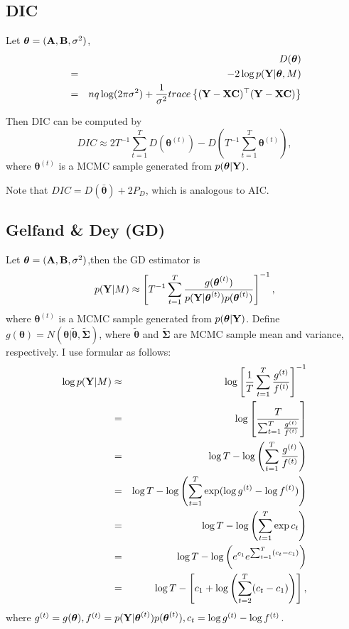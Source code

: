 \documentclass[]{book}
\begin{document}
\hypertarget{dic}{%
\subsection{DIC}\label{dic}}

Let \({\boldsymbol \theta}=({\bf A},{\bf B},\sigma^2)\),
\begin{eqnarray*}
    &&D({\boldsymbol \theta})\\
    &=&-2\log p({\bf Y}|{\boldsymbol \theta},M) \\
    &=&nq\log(2\pi\sigma^2)+ \frac{1}{\sigma^2} trace\left\{({\bf Y}-{\bf X}{\bf C})^{{\top}}({\bf Y}-{\bf X}{\bf C}) \right\}
\end{eqnarray*}

Then DIC can be computed by
\[
DIC \approx 2T^{-1}\sum_{t=1}^{T}D({\boldsymbol \theta}^{(t)})-D(T^{-1}\sum_{t=1}^{T}{\boldsymbol \theta}^{(t)}),
\]
where \({\boldsymbol \theta}^{(t)}\) is a MCMC sample generated from \(p({\boldsymbol \theta}|{\bf Y})\).

Note that \(DIC=D(\bar{{\boldsymbol \theta}})+2P_D\), which is analogous to AIC.

\hypertarget{gelfand-dey-gd}{%
\subsection{Gelfand \& Dey (GD)}\label{gelfand-dey-gd}}

Let \({\boldsymbol \theta}=({\bf A},{\bf B},\sigma^2)\),then the GD estimator is \[p({\bf Y}|M)\approx\left[T^{-1}\sum_{t=1}^{T}\frac{g({\boldsymbol \theta}^{(t)})}{p({\bf Y}|{\boldsymbol \theta}^{(t)})p({\boldsymbol \theta}^{(t)})}\right]^{-1},\]
where \({\boldsymbol \theta}^{(t)}\) is a MCMC sample generated from \(p({\boldsymbol \theta}|{\bf Y})\). Define \(g({\boldsymbol \theta})=N({\boldsymbol \theta}|\tilde{{\boldsymbol \theta}},\tilde{{\boldsymbol \Sigma}})\), where \(\tilde{{\boldsymbol \theta}}\) and \(\tilde{{\boldsymbol \Sigma}}\) are MCMC sample mean and variance, respectively.
I use formular as follows:
\begin{eqnarray}
\log p({\bf Y}|M)&\approx& \log \left[\frac{1}{T}\sum_{t=1}^{T}\frac{g^{(t)}}{f^{(t)}}\right]^{-1}\nonumber\\
&=&\log \left[\frac{T}{\sum_{t=1}^{T}\frac{g^{(t)}}{f^{(t)}}}\right]\nonumber\\
&=&\log T - \log \left(\sum_{t=1}^{T}\frac{g^{(t)}}{f^{(t)}}\right)\nonumber\\
&=&\log T - \log \left(\sum_{t=1}^{T}\exp (\log g^{(t)}-\log f^{(t)})\right)\label{eq:4}\\
&=&\log T - \log \left(\sum_{t=1}^{T}\exp c_t\right)\nonumber\\
&=&\log T - \log \left(e^{ c_{1} }e^{\sum_{t=1}^{T} (c_t-c_{1})}\right)\nonumber\\
&=&\log T - \left[c_1 + \log \left(\sum_{t=2}^{T} (c_t-c_{1})\right)\right]\nonumber,
\end{eqnarray}
where \(g^{(t)}=g({\boldsymbol \theta}), f^{(t)}=p({\bf Y}|{\boldsymbol \theta}^{(t)})p({\boldsymbol \theta}^{(t)}), c_t = \log g^{(t)}-\log f^{(t)}\).
\end{document}
